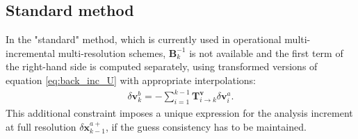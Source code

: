 \documentclass[npg, manuscript]{copernicus}
\begin{document}
\subsection{Standard method}
In the "standard" method, which is currently used in operational multi-incremental multi-resolution schemes, $\mathbf{B}_k^{-1}$ is not available and the first term of the right-hand side is computed separately, using transformed versions of equation \eqref{eq:back_inc_U} with appropriate interpolations:
\begin{align}
\label{eq:back_inc_Uvar}
\delta \mathbf{v}^b_k = - \sum_{i=1}^{k-1} \mathbf{T}^\mathbf{v}_{i \rightarrow k} \delta \mathbf{v}^a_i.
\end{align}
This additional constraint imposes a unique expression for the analysis increment at full resolution $\delta \mathbf{x}^{a+}_{k-1}$, if the guess consistency has to be maintained.
\end{document}
